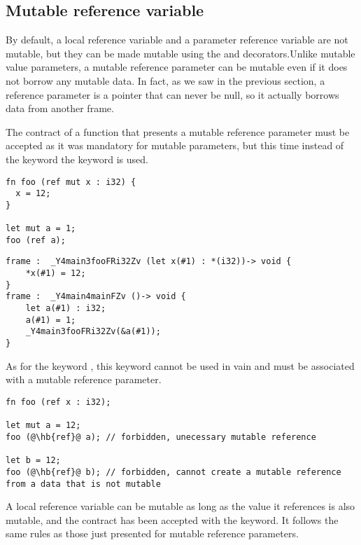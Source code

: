 \subsection {Mutable reference variable}
\label{sec:mut_ref_param}

By default, a local reference variable and a parameter reference variable are
not mutable, but they can be made mutable using the  and 
decorators.Unlike mutable value parameters, a mutable reference parameter can be
mutable even if it does not borrow any mutable data. In fact, as we saw in the
previous section, a reference parameter is a pointer that can never be null, so
it actually borrows data from another frame.

The contract of a function that presents a mutable reference parameter must be
accepted as it was mandatory for mutable parameters, but this time instead of
the keyword  the keyword  is used.

\begin{lstlisting}[style=coloredverbatim]
fn foo (ref mut x : i32) {
  x = 12;
}

let mut a = 1;
foo (ref a);
\end{lstlisting}

\begin {lstlisting}[style=intermediateVerb]
frame :  _Y4main3fooFRi32Zv (let x(#1) : *(i32))-> void {
    *x(#1) = 12;
}
frame :  _Y4main4mainFZv ()-> void {
    let a(#1) : i32;
    a(#1) = 1;
    _Y4main3fooFRi32Zv(&a(#1));
}
\end{lstlisting}

As for the keyword , this keyword  cannot be used in
vain and must be associated with a mutable reference parameter.

\begin{lstlisting}[style=coloredverbatim, escapechar=@]
fn foo (ref x : i32);

let mut a = 12;
foo (@\hb{ref}@ a); // forbidden, unecessary mutable reference

let b = 12;
foo (@\hb{ref}@ b); // forbidden, cannot create a mutable reference from a data that is not mutable
\end{lstlisting}

A local reference variable can be mutable as long as the value it references is
also mutable, and the contract has been accepted with the  keyword.
It follows the same rules as those just presented for mutable reference
parameters.

